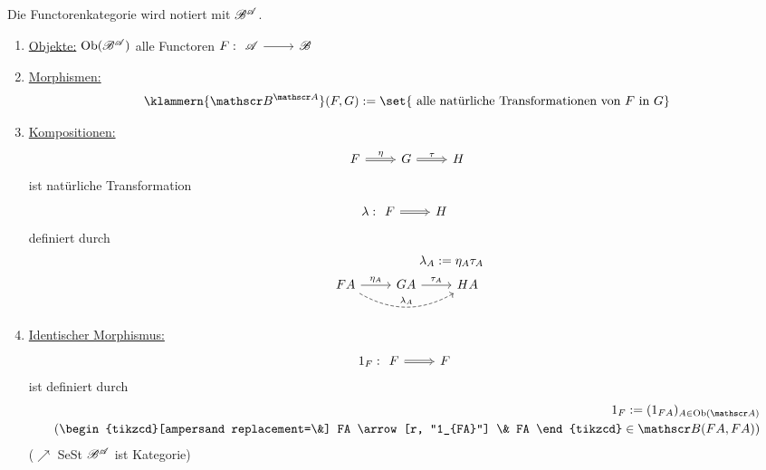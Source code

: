 \begin{defi}[Functorenkategorie] %
	\label{def:Functorkat}
	Die Functorenkategorie wird notiert mit $\mathscr B^{\mathscr A}$.
	\begin{enumerate}[label=]
		\item \ul{Objekte:} $\operatorname{Ob}(\mathscr B^{\mathscr A})$ alle Functoren $F: \begin{tikzcd}
		\CatA \arrow[r] & \CatB
		\end{tikzcd}$
		\item \ul{Morphismen:}
		\[
		\klammern{\CatB^{\CatA}} (F,G) := \set{ \text{ alle natürliche Transformationen von } F \text{ in } G}
		\]
		\item \ul{Kompositionen:} 
		\[
			\begin{tikzcd}
				F \arrow[r, Rightarrow, "\eta"] & G \arrow[r, Rightarrow, "\tau"] & H
			\end{tikzcd}
		\]
		ist natürliche Transformation
		\[
			\lambda: \begin{tikzcd}
				F \arrow[r, Rightarrow] & H	
			\end{tikzcd}
		\]
		definiert durch
		\begin{align*}
			\lambda_A := \eta_A \tau_A\\
			\begin{tikzcd}[ampersand replacement=\&]
				FA \arrow[r, "\eta_A"] \arrow[rr, "\lambda_A", dashed, bend right] \& GA \arrow[r, "\tau_A"] \& HA
			\end{tikzcd}
		\end{align*}
		\item \ul{Identischer Morphismus:}
		\begin{align*}
			1_F : \begin{tikzcd}[ampersand replacement=\&]
			F \arrow[r, Rightarrow] \& F
			\end{tikzcd}
		\end{align*}
		ist definiert durch
		\begin{align*}
			1_F := (1_{FA})_{A \in \Ob(\CatA)}\\
			(\begin{tikzcd}[ampersand replacement=\&]
				FA \arrow[r, "1_{FA}"] \& FA
			\end{tikzcd} \in \CatB(FA, FA))
		\end{align*}
		($\nearrow$ SeSt $\mathscr B^{\mathscr A}$ ist Kategorie)
	\end{enumerate}
\end{defi}
